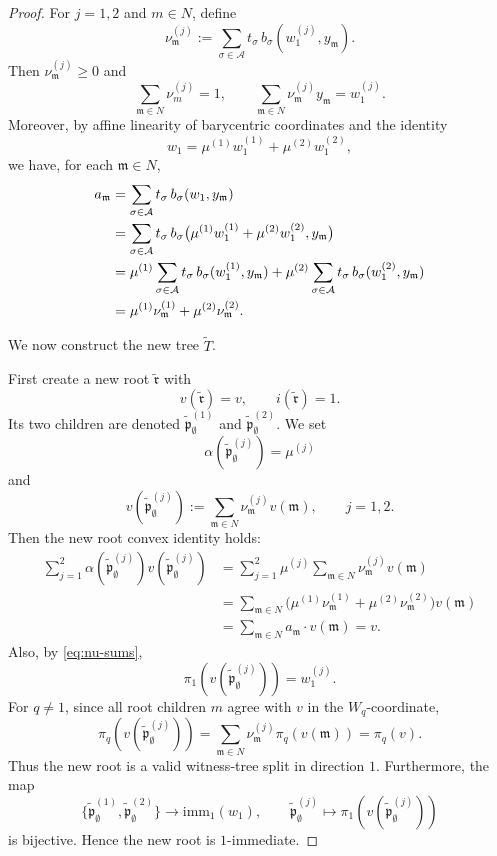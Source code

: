 \documentclass[10pt]{amsart}
\theoremstyle{plain}
\theoremstyle{definition}
\let\geq\geqslant
\providecommand{\imm}[0]{\ensuremath{\mathrm{imm}}\xspace}
\newcommand{\fr}{\mathfrak{r}}
\newcommand{\fm}{\mathfrak{m}}
\newcommand{\fp}{\mathfrak{p}}
\begin{document}
\begin{proof}
For $j=1,2$ and $m\in N$, define
\begin{equation}\label{eq:nu-def}
  \nu_\fm^{(j)}
  :=
  \sum_{\sigma\in\mathcal A}
  t_\sigma\, b_\sigma(w_1^{(j)},y_\fm).
\end{equation}
Then $\nu_\fm^{(j)}\geq 0$ and
\begin{equation}\label{eq:nu-sums}
  \sum_{\fm\in N}\nu_m^{(j)}=1,\qquad
  \sum_{\fm\in N}\nu_\fm^{(j)}y_\fm=w_1^{(j)}.
\end{equation}
Moreover, by affine linearity of barycentric coordinates and the
identity
\[
  w_1=\mu^{(1)}w_1^{(1)}+\mu^{(2)}w_1^{(2)},
\]
we have, for each $\fm\in N$,
\begin{align}
  a_\fm
  &=
  \sum_{\sigma\in\mathcal A}
  t_\sigma\,b_\sigma(w_1,y_\fm) \notag\\
  &=
  \sum_{\sigma\in\mathcal A}
  t_\sigma\,
  b_\sigma\bigl(\mu^{(1)}w_1^{(1)}+\mu^{(2)}w_1^{(2)},y_\fm\bigr)
  \notag\\
  &=
  \mu^{(1)}
  \sum_{\sigma\in\mathcal A}
  t_\sigma\,b_\sigma(w_1^{(1)},y_\fm)
  +
  \mu^{(2)}
  \sum_{\sigma\in\mathcal A}
  t_\sigma\,b_\sigma(w_1^{(2)},y_\fm) \notag\\
  &=
  \mu^{(1)}\nu_\fm^{(1)}+\mu^{(2)}\nu_\fm^{(2)}.
  \label{eq:a-nu}
\end{align}

We now construct the new tree $\widetilde T$.

First create a new root $\widetilde{\fr}$ with
\[
  v(\widetilde{\fr})=v,\qquad i(\widetilde{\fr})=1.
\]
Its two children are denoted $\widetilde{\fp}^{(1)}_{\emptyset}$ and
$\widetilde{\fp}^{(2)}_{\emptyset}$.  We set
\[
  \alpha(\widetilde{\fp}^{(j)}_{\emptyset})=\mu^{(j)}
\]
and
\begin{equation}\label{eq:root-child-value}
  v(\widetilde{\fp}^{(j)}_{\emptyset})
  :=
  \sum_{\fm\in N}\nu_\fm^{(j)}v(\fm),
  \qquad j=1,2.
\end{equation}
Then the new root convex identity holds:
\begin{align*}
  \sum_{j=1}^2 \alpha(\widetilde{\fp}^{(j)}_{\emptyset})
  v(\widetilde{\fp}^{(j)}_{\emptyset})
  &=
  \sum_{j=1}^2 \mu^{(j)}
  \sum_{\fm\in N}\nu_\fm^{(j)}v(\fm)  \\
  &=
  \sum_{\fm\in N}
  \bigl(\mu^{(1)}\nu_\fm^{(1)}+\mu^{(2)}\nu_\fm^{(2)}\bigr)v(\fm) \\
  &=
  \sum_{\fm\in N}a_\fm \cdot v(\fm)=v.
\end{align*}
Also, by \eqref{eq:nu-sums},
\[
  \pi_1(v(\widetilde{\fp}^{(j)}_{\emptyset}))=w_1^{(j)}.
\]
For $q\neq 1$, since all root children $m$ agree with $v$ in the
$W_q$-coordinate,
\[
  \pi_q(v(\widetilde{\fp}^{(j)}_{\emptyset}))
  =
  \sum_{\fm\in N}\nu_\fm^{(j)}\pi_q(v(\fm))
  =
  \pi_q(v).
\]
Thus the new root is a valid witness-tree split in direction $1$.
Furthermore, the map
\[
  \{\widetilde{\fp}^{(1)}_{\emptyset},\widetilde{\fp}^{(2)}_{\emptyset}\}
  \longrightarrow
  \imm_1(w_1),
  \qquad
  \widetilde{\fp}^{(j)}_{\emptyset}\longmapsto
  \pi_1(v(\widetilde{\fp}^{(j)}_{\emptyset}))
\]
is bijective. Hence the new root is $1$-immediate.


\end{proof}
\end{document}
